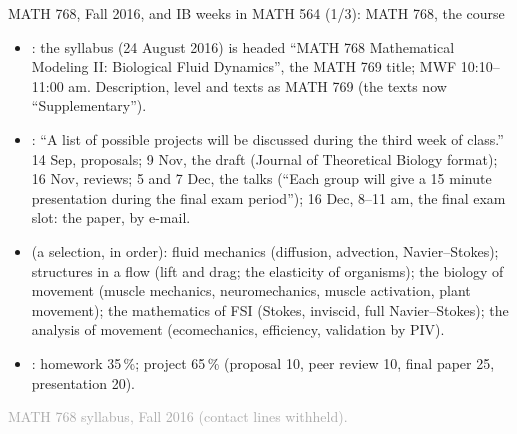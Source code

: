 \documentclass[aspectratio=169,11pt]{beamer}
\newcommand{\sourcecredit}[1]{\vfill\begin{flushright}\tiny\textcolor{DarkGray}{#1}\end{flushright}}
\begin{document}
\begin{frame}{MATH 768, Fall 2016, and IB weeks in MATH 564 (1/3): MATH 768, the course}
\label{fr:m768}
\footnotesize
\begin{itemize}\setlength{\itemsep}{3pt}
  \item {}: the syllabus (24 August 2016) is headed ``MATH 768 Mathematical Modeling II: Biological Fluid Dynamics'', the MATH 769 title; MWF 10:10--11:00 am. Description, level and texts as MATH 769 (the texts now ``Supplementary'').
  \item {}: ``A list of possible projects will be discussed during the third week of class.'' 14 Sep, proposals; 9 Nov, the draft (Journal of Theoretical Biology format); 16 Nov, reviews; 5 and 7 Dec, the talks (``Each group will give a 15 minute presentation during the final exam period''); 16 Dec, 8--11 am, the final exam slot: the paper, by e-mail.
  \item {} (a selection, in order): fluid mechanics (diffusion, advection, Navier--Stokes); structures in a flow (lift and drag; the elasticity of organisms); the biology of movement (muscle mechanics, neuromechanics, muscle activation, plant movement); the mathematics of FSI (Stokes, inviscid, full Navier--Stokes); the analysis of movement (ecomechanics, efficiency, validation by PIV).
  \item {}: homework 35\,\%; project 65\,\% (proposal 10, peer review 10, final paper 25, presentation 20).
\end{itemize}
\sourcecredit{MATH 768 syllabus, Fall 2016 (contact lines withheld).}
\end{frame}
\end{document}
